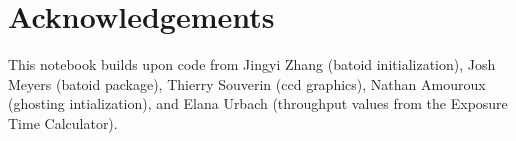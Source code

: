 \documentclass[SE,authoryear,toc]{lsstdoc}
\begin{document}
\section{Acknowledgements}
This notebook builds upon code from Jingyi Zhang (batoid initialization), Josh Meyers (batoid package), Thierry Souverin (ccd graphics), Nathan Amouroux (ghosting intialization), and Elana Urbach (throughput values from the Exposure Time Calculator).

%

%
\end{document}
